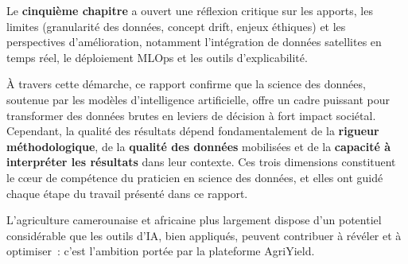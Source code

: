 \bigskip
Le \textbf{cinquième chapitre} a ouvert une réflexion critique sur les apports, les limites (granularité des données, concept drift, enjeux éthiques) et les perspectives d'amélioration, notamment l'intégration de données satellites en temps réel, le déploiement MLOps et les outils d'explicabilité.

\bigskip
\noindent À travers cette démarche, ce rapport confirme que la science des données, soutenue par les modèles d'intelligence artificielle, offre un cadre puissant pour transformer des données brutes en leviers de décision à fort impact sociétal. Cependant, la qualité des résultats dépend fondamentalement de la \textbf{rigueur méthodologique}, de la \textbf{qualité des données} mobilisées et de la \textbf{capacité à interpréter les résultats} dans leur contexte. Ces trois dimensions constituent le c\oe{}ur de compétence du praticien en science des données, et elles ont guidé chaque étape du travail présenté dans ce rapport.

\bigskip
L'agriculture camerounaise et africaine plus largement dispose d'un potentiel considérable que les outils d'IA, bien appliqués, peuvent contribuer à révéler et à optimiser~: c'est l'ambition portée par la plateforme AgriYield.

\newpage
